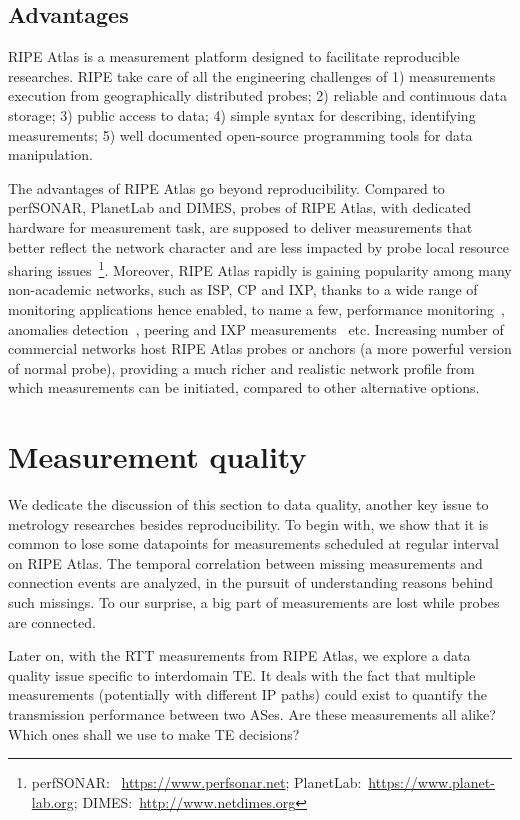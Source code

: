 \subsection{Advantages}
RIPE Atlas is a measurement platform designed to facilitate reproducible researches. RIPE take care of all the engineering challenges of 1) measurements execution from geographically distributed probes; 2) reliable and continuous data storage; 3) public access to data; 4) simple syntax for describing, identifying measurements; 5) well documented open-source programming tools for data manipulation.

The advantages of RIPE Atlas go beyond reproducibility. Compared to perfSONAR, PlanetLab and DIMES, probes of RIPE Atlas, with dedicated hardware for measurement task, are supposed to deliver measurements that better reflect the network character and are less impacted by probe local resource sharing issues~\footnote{perfSONAR: ~\url{https://www.perfsonar.net}; PlanetLab:~\url{https://www.planet-lab.org}; DIMES:~\url{http://www.netdimes.org}}.
Moreover, RIPE Atlas rapidly is gaining popularity among many non-academic networks, such as \ac{ISP}, \ac{CP} and \ac{IXP}, thanks to a wide range of monitoring applications hence enabled, to name a few, performance monitoring~\cite{latencymon, Rimondini2014}, anomalies detection~\cite{Fontugne2016, Padmanabhan, halo}, peering and IXP measurements~\cite{ixp, routeixp} etc. Increasing number of commercial networks host RIPE Atlas probes or anchors (a more powerful version of normal probe),   providing a much richer and realistic network profile from which measurements can be initiated, compared to other alternative options.

\section{Measurement quality}
We dedicate the discussion of this section to data quality, another key issue to metrology researches besides reproducibility. To begin with, we show that it is common to lose some datapoints for measurements scheduled at regular interval on RIPE Atlas. The temporal correlation between missing measurements and connection events are 
analyzed, in the pursuit of understanding reasons behind such missings.
To our surprise, a big part of measurements are lost while probes are connected.

Later on, with the RTT measurements from RIPE Atlas, we explore a data quality issue specific to interdomain TE. It deals with the fact that multiple measurements (potentially with different IP paths) could exist to quantify the transmission performance between two ASes. Are these measurements all alike? Which ones shall we use to make TE decisions?

